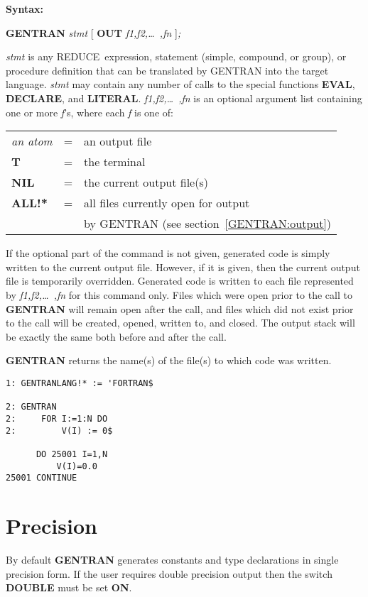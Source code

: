 \documentclass[11pt,letterpaper]{book}
\makeatletter
\newcommand{\REDUCE}{REDUCE}
\newcommand{\underscore}{\_}
\newcommand{\ttindex}[1]{{\renewcommand{\_}{\protect\underscore}%
                          \index{#1@{\tt #1}}}}
\newenvironment{describe}[1]{\par{\bf #1}\begin{indented}}{\end{indented}}
\makeatother
\begin{document}
\begin{describe}{Syntax:}
{\bf GENTRAN} {\it stmt} [ {\bf OUT} {\it f1,f2,\dots\  ,fn} ]{\it ;}
\end{describe}

{\it stmt} is any \REDUCE\ expression, statement (simple, compound, or
group), or procedure definition that can be translated by GENTRAN into the
target language.
{\it stmt} may contain any number of calls
to the special functions {\bf EVAL}, {\bf DECLARE}, and {\bf LITERAL}.
{\it f1,f2,\dots\  ,fn } is an optional argument list containing one or more
{\it f}'s, where each {\it f} is one of:
\par
\begin{tabular}{lll}
{\it an atom} &= &an output file\\
{\bf T} &= &the terminal\\
{\bf NIL} &= &the current output file(s)\\
\ttindex{ALL"!*} {\bf ALL!*} &= &all files currently open for output \\
& & by GENTRAN (see section~\ref{GENTRAN:output})\\
\end{tabular}

If the optional part of the command is not given, generated code is simply
written to the current output file.  However, if it is
given, then the current output file is temporarily overridden.  Generated
code is written to each file represented by
{\it f1,f2,\dots\  ,fn} for this command only.  Files which were open prior
to the call to {\bf GENTRAN} will remain open after the call, and files
which did not exist prior to the call will be created, opened, written to,
and closed.  The output stack will be exactly the same both before and
after the call.

{\bf GENTRAN}  returns the name(s) of the file(s) to which code was
written.

{\small\begin{verbatim}
1: GENTRANLANG!* := 'FORTRAN$

2: GENTRAN
2:     FOR I:=1:N DO
2:         V(I) := 0$

      DO 25001 I=1,N
          V(I)=0.0
25001 CONTINUE

\end{verbatim}}

\section{Precision}
\label{precision}
By default {\bf GENTRAN} generates constants and type declarations in
single precision form.  If the user requires double precision output
then the switch {\bf DOUBLE} must be set {\bf ON}.
\end{document}
